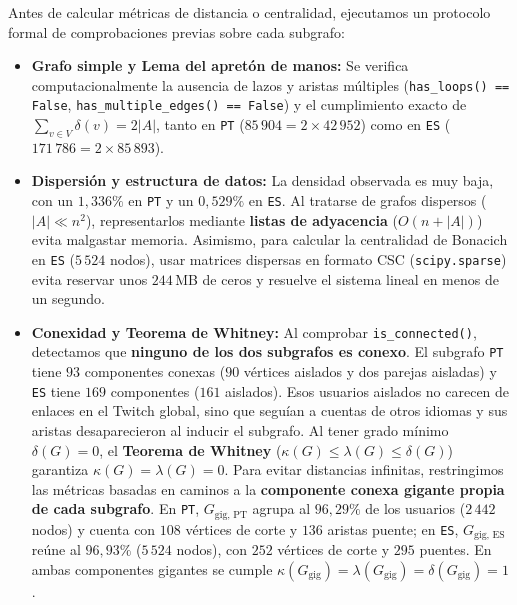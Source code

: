\documentclass[11pt,a4paper]{article}
\begin{document}
Antes de calcular métricas de distancia o centralidad, ejecutamos un protocolo formal de comprobaciones previas sobre cada subgrafo:
\begin{itemize}[leftmargin=*, itemsep=2pt]
  \item \textbf{Grafo simple y Lema del apretón de manos:} Se verifica computacionalmente la ausencia de lazos y aristas múltiples (\texttt{has\_loops() == False}, \texttt{has\_multiple\_edges() == False}) y el cumplimiento exacto de $\sum_{v \in V} \delta(v) = 2|A|$, tanto en \texttt{PT} ($85\,904 = 2 \times 42\,952$) como en \texttt{ES} ($171\,786 = 2 \times 85\,893$).
  \item \textbf{Dispersión y estructura de datos:} La densidad observada es muy baja, con un $1,336\%$ en \texttt{PT} y un $0,529\%$ en \texttt{ES}. Al tratarse de grafos dispersos ($|A| \ll n^2$), representarlos mediante \textbf{listas de adyacencia} ($O(n + |A|)$) evita malgastar memoria. Asimismo, para calcular la centralidad de Bonacich en \texttt{ES} ($5\,524$ nodos), usar matrices dispersas en formato CSC (\texttt{scipy.sparse}) evita reservar unos $244$\,MB de ceros y resuelve el sistema lineal en menos de un segundo.
  \item \textbf{Conexidad y Teorema de Whitney:} Al comprobar \texttt{is\_connected()}, detectamos que \textbf{ninguno de los dos subgrafos es conexo}. El subgrafo \texttt{PT} tiene $93$ componentes conexas ($90$ vértices aislados y dos parejas aisladas) y \texttt{ES} tiene $169$ componentes ($161$ aislados). Esos usuarios aislados no carecen de enlaces en el Twitch global, sino que seguían a cuentas de otros idiomas y sus aristas desaparecieron al inducir el subgrafo. Al tener grado mínimo $\delta(G) = 0$, el \textbf{Teorema de Whitney} ($\kappa(G) \le \lambda(G) \le \delta(G)$) garantiza $\kappa(G) = \lambda(G) = 0$. Para evitar distancias infinitas, restringimos las métricas basadas en caminos a la \textbf{componente conexa gigante propia de cada subgrafo}. En \texttt{PT}, $G_{\text{gig, PT}}$ agrupa al $96,29\%$ de los usuarios ($2\,442$ nodos) y cuenta con $108$ vértices de corte y $136$ aristas puente; en \texttt{ES}, $G_{\text{gig, ES}}$ reúne al $96,93\%$ ($5\,524$ nodos), con $252$ vértices de corte y $295$ puentes. En ambas componentes gigantes se cumple $\kappa(G_{\text{gig}}) = \lambda(G_{\text{gig}}) = \delta(G_{\text{gig}}) = 1$.
\end{itemize}
\end{document}
